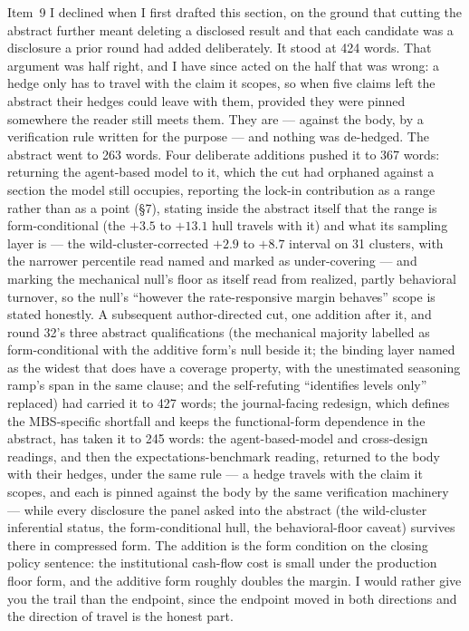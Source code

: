 \documentclass[11pt]{article}
\begin{document}
Item~9 I declined when I first drafted this section, on the ground that cutting the
abstract further meant deleting a disclosed result and that each candidate was a
disclosure a prior round had added deliberately. It stood at 424 words. That
argument was half right, and I have since acted on the half that was wrong: a hedge
only has to travel with the claim it scopes, so when five claims left the abstract
their hedges could leave with them, provided they were pinned somewhere the reader
still meets them. They are --- against the body, by a verification rule written for
the purpose --- and nothing was de-hedged. The abstract went to 263 words. Four
deliberate additions pushed it to 367 words: returning the agent-based model to
it, which the cut had orphaned against a section the model still occupies,
reporting the lock-in contribution as a range rather than as a point (\S7),
stating inside the abstract itself that the range is form-conditional (the
$+3.5$ to $+13.1$ hull travels with it) and what its sampling layer is --- the
wild-cluster-corrected $+2.9$ to $+8.7$ interval on 31 clusters, with the
narrower percentile read named and marked as under-covering --- and marking the
mechanical null's floor as itself read from realized, partly behavioral
turnover, so the null's ``however the rate-responsive margin behaves'' scope is stated honestly. A
subsequent author-directed cut, one addition after it, and round 32's three abstract qualifications
(the mechanical majority labelled as form-conditional with the additive form's null beside
it; the binding layer named as the widest that does have a coverage property, with the
unestimated seasoning ramp's span in the same clause; and the self-refuting ``identifies
levels only'' replaced) had carried it to 427 words; the journal-facing redesign, which defines the MBS-specific shortfall and keeps the functional-form dependence in the abstract, has taken it to 245 words: the agent-based-model
and cross-design readings, and then the expectations-benchmark reading, returned to
the body with their hedges, under the same rule --- a hedge travels with the claim
it scopes, and each is pinned against the body by the same verification
machinery --- while every disclosure the panel asked into the abstract (the
wild-cluster inferential status, the form-conditional hull, the behavioral-floor
caveat) survives there in compressed form. The addition is the form condition on the closing policy sentence: the institutional cash-flow cost is small under the production floor form, and the additive form roughly doubles the margin. I would
rather give you the trail than the endpoint, since the endpoint moved in both directions
and the direction of travel is the honest part.
\end{document}
